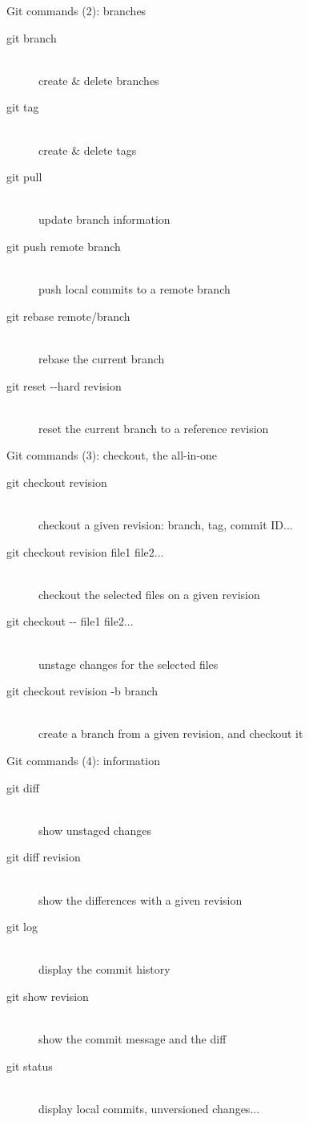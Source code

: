 \documentclass{beamer}
\begin{document}
\begin{frame}{Git commands (2): branches}
  \begin{description}
    \item[git branch] \hfill \\
      create \& delete branches
    \item[git tag] \hfill \\
      create \& delete tags
    \item[git pull] \hfill \\
      update branch information
    \item[git push remote branch] \hfill \\
      push local commits to a remote branch
    \item[git rebase remote/branch] \hfill \\
      rebase the current branch
    \item[git reset -{}-hard revision] \hfill \\
      reset the current branch to a reference revision
  \end{description}
\end{frame}

\begin{frame}{Git commands (3): checkout, the all-in-one}
  \begin{description}
    \item[git checkout revision] \hfill \\
      checkout a given revision: branch, tag, commit ID...
    \item[git checkout revision file1 file2...] \hfill \\
      checkout the selected files on a given revision
    \item[git checkout -{}- file1 file2...] \hfill \\
      unstage changes for the selected files
    \item[git checkout revision -b branch] \hfill \\
      create a branch from a given revision, and checkout it
  \end{description}
\end{frame}

\begin{frame}{Git commands (4): information}
  \begin{description}
    \item[git diff] \hfill \\
      show unstaged changes
    \item[git diff revision] \hfill \\
      show the differences with a given revision
    \item[git log] \hfill \\
      display the commit history
    \item[git show revision] \hfill \\
      show the commit message and the diff
    \item[git status] \hfill \\
      display local commits, unversioned changes...
  \end{description}
\end{frame}
\end{document}
